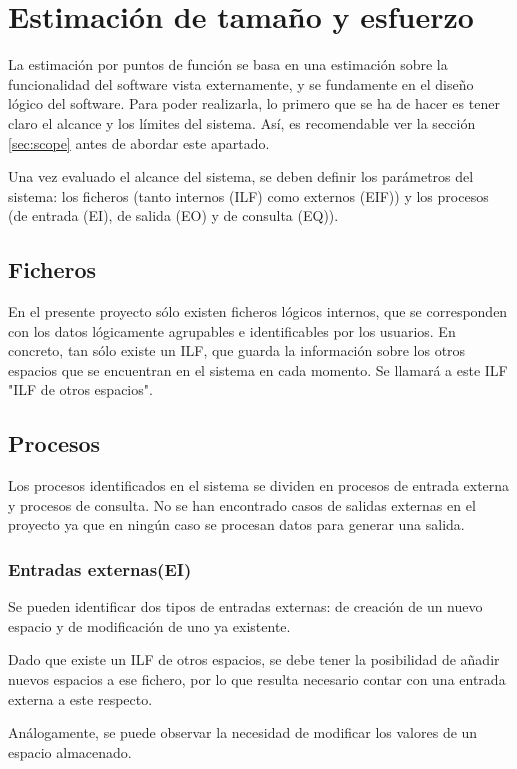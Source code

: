 \chapter{Estimación de tamaño y esfuerzo}
\par La estimación por puntos de función se basa en una estimación sobre la funcionalidad del software vista externamente, y se fundamente en el diseño lógico del software. Para poder realizarla, lo primero que se ha de hacer es tener claro el alcance y los límites del sistema. Así, es recomendable ver la sección \ref{sec:scope} antes de abordar este apartado.

\par Una vez evaluado el alcance del sistema, se deben definir los parámetros del sistema: los ficheros (tanto internos (ILF) como externos (EIF)) y los procesos (de entrada (EI), de salida (EO) y de consulta (EQ)).

\section{Ficheros}
\par En el presente proyecto sólo existen ficheros lógicos internos, que se corresponden con los datos lógicamente agrupables e identificables por los usuarios. En concreto, tan sólo existe un ILF, que guarda la información sobre los otros espacios que se encuentran en el sistema en cada momento. Se llamará a este ILF "ILF de otros espacios".

\section{Procesos}
\par Los procesos identificados en el sistema se dividen en procesos de entrada externa y procesos de consulta. No se han encontrado casos de salidas externas en el proyecto ya que en ningún caso se procesan datos para generar una salida.

\subsection{Entradas externas(EI)}
\par Se pueden identificar dos tipos de entradas externas: de creación de un nuevo espacio y de modificación de uno ya existente.
\begin{description}[style=multiline, leftmargin=3cm]
    \item[Crear nuevo espacio] Dado que existe un ILF de otros espacios, se debe tener la posibilidad de añadir nuevos espacios a ese fichero, por lo que resulta necesario contar con una entrada externa a este respecto.
    \item[Modificar espacio] Análogamente, se puede observar la necesidad de modificar los valores de un espacio almacenado.
\end{description}


